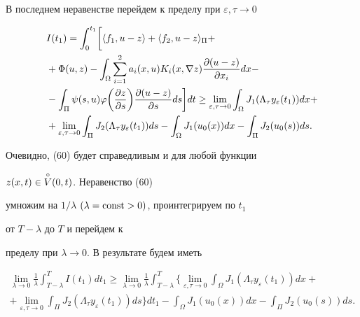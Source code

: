 В последнем неравенстве перейдем к пределу при $\varepsilon,\tau \to 0$ 


\begin{align} 


&I(t_1) = \int_0^{t_1}\biggl [\langle f_1,u-z\rangle + 


\langle f_2,u-z\rangle_\Pi + \notag\\ 


&+ \Phi(u,z) -\int_\Omega \sum^2_{i=1}a_i(x,u) K_i(x,\nabla z) 


\frac{\partial(u-z)}{\partial x_i}dx - \notag\\ 


&-\int_\Pi \psi(s,u)\varphi\biggl(\frac{\partial z}{\partial s}\biggr) 


\frac{\partial(u-z)}{\partial s}ds\biggr ]dt \ge \lim_{\varepsilon,\tau \to 0} 


\int_\Omega J_1(\Lambda_\tau y_\varepsilon(t_1))dx + \notag \\ 


&+\lim_{\varepsilon,\tau\to 0}\int_\Pi J_2(\Lambda_\tau y_\varepsilon(t_1))ds 


-\int_\Omega J_1(u_0(x))dx - \int_\Pi J_2(u_0(s))ds. 


\end{align} 


Очевидно, (60) будет справедливым и для любой функции 


$z(x,t)\in \overset{\circ} V(0,t)$. Неравенство (60) 


умножим на $1/\lambda$ $(\lambda=\operatorname{const}>0)$, проинтегрируем по $t_1$ 


от $T-\lambda$ до $T$ и перейдем к 


пределу при $\lambda\to 0$. В результате будем иметь 


\begin{multline} 


\lim_{\lambda \to 0} \frac{1}{\lambda}\int^T_{T-\lambda} 


I(t_1)dt_1 \ge \lim_{\lambda \to 0}\frac{1}{\lambda} 


\int^T_{T-\lambda}\biggl\{\lim_{\varepsilon,\tau \to 0}\int_\Omega 


J_1(\Lambda_\tau y_\varepsilon(t_1))dx + \\ 


+\lim_{\varepsilon,\tau \to 0}\int_\Pi J_2(\Lambda_\tau y_\varepsilon 


(t_1))ds\biggr\}dt_1 - \int_\Omega J_1(u_0(x))dx-\int_\Pi J_2(u_0(s))ds. 


\end{multline} 


